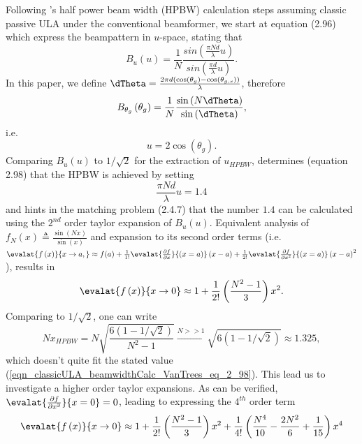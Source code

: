 Following \cite{VanTrees2002DetectionIV}'s half power beam width (HPBW) calculation steps assuming classic passive ULA under the conventional beamformer, we start at equation (2.96) which express the beampattern in $u$-space, stating that
$$
B_{u}\left(u\right)=
\frac{1}{N}
\frac{
sin\left(\frac{\pi{}Nd}{\lambda}u\right)
}{
sin\left(\frac{\pi{}d}{\lambda}u\right)
}.
$$
In this paper, we define $\dTheta = \frac{2\pi{}d\left(\cos\left(\theta_{g}\right)-\cos\left(\theta_{g,s}\right)\right)}{\lambda}$, therefore
$$
B_{\theta_{g}}\left(\theta_{g}\right)=
\frac{1}{N}
\frac{
\sin\left(N\dTheta\right)
}{
\sin\left(\dTheta\right)
},
$$
i.e.
\begin{equation}
     u = 2\cos\left(\theta_{g}\right).
\end{equation}
Comparing $B_{u}\left(u\right)$ to $1/\sqrt{2}$ for the extraction of $u_{HPBW}$, \cite{VanTrees2002DetectionIV} determines (equation 2.98) that the HPBW is achieved by setting 
\begin{equation}
    \label{eqn_classicULA_beamwidthCalc_VanTrees_eq_2_98}
    \frac{\pi{}Nd}{\lambda}u = 1.4
\end{equation}
and hints in the matching problem (2.4.7) that the number $1.4$ can be calculated using the $2^{nd}$ order taylor expansion of $B_{u}\left(u\right)$. Equivalent analysis of $ f_{N}\left(x\right)\triangleq\frac{\sin\left(Nx\right)}{\sin\left(x\right)} $ and expansion to its second order terms (i.e.
$
\evalat{f\left(x\right)}{x\to{}a,} \approx 
f(a) + 
\frac{1}{1!}\evalat{\frac{\partial{f}}{\partial{x}}}{\left(x=a\right)}\left(x-a\right) 
+ 
\frac{1}{2!}\evalat{\frac{\partial{f}}{\partial{x^{2}}}}{\left(x=a\right)}\left(x-a\right)^{2}
$), results in
\begin{equation}
    \evalat{f\left(x\right)}{x\to0}
    \approx
    1 + \frac{1}{2!}\left(\frac{N^{2}-1}{3}\right)x^{2}.
\end{equation}
Comparing to $1/\sqrt{2}$, one can write
\begin{equation*}
    Nx_{HPBW} = N\sqrt{\frac{6\left(1-1/\sqrt{2}\right)}{N^{2}-1}}
    \overset{N>>1}{\to} \sqrt{6\left(1-1/\sqrt{2}\right)} \approx 1.325,
\end{equation*}
which doesn't quite fit the stated value (\ref{eqn_classicULA_beamwidthCalc_VanTrees_eq_2_98}). This lead us to investigate a higher order taylor expansions. As can be verified, $\evalat{\frac{\partial{f}}{\partial{x}^{3}}}{x=0} = 0$, leading to expressing the $4^{th}$ order term
\begin{equation}
    \evalat{f\left(x\right)}{x\to0}
    \approx
    1 
    + 
    \frac{1}{2!}\left(\frac{N^{2}-1}{3}\right)x^{2}
    +
    \frac{1}{4!}\left(\frac{N^{4}}{10}-\frac{2N^{2}}{6}+\frac{1}{15}\right)x^{4}
\end{equation}
